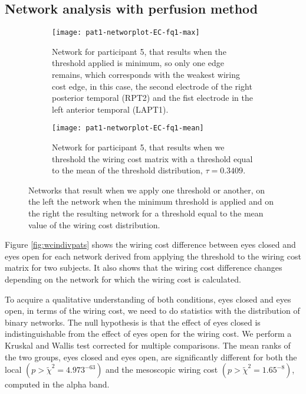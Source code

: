\documentclass[11pt, onecolumn]{article}
\begin{document}
\subsection{Network analysis with perfusion method}
 

\begin{figure}[ht] 
  \begin{subfigure}[t]{0.5\linewidth}
    \centering
    \texttt{[image: pat1-networplot-EC-fq1-max]} 
    \caption{Network for participant 5, that results when  the threshold applied is minimum, so only one edge remains, which corresponds with the weakest wiring cost edge, in this case, the second electrode of the right posterior temporal (RPT2) and the fist electrode in the left anterior temporal (LAPT1).} 
    \label{binaryplotnetwork:a} 
    \vspace{4ex}
  \end{subfigure}%
  \hspace{1ex}
  \begin{subfigure}[t]{0.5\linewidth}
    \centering
    \texttt{[image: pat1-networplot-EC-fq1-mean]} 
    \caption{Network for participant 5, that results when we threshold the wiring cost matrix with a threshold equal to the mean of the threshold distribution, $\tau =  0.3409$.}
    \label{binaryplotnetwork:b} 
    \vspace{4ex}
  \end{subfigure} 
  \caption{Networks that result when we apply one threshold or another, on the left the network when the minimum threshold is applied and on the right the resulting network for a threshold equal to the mean value of the wiring cost distribution.}
  \label{fig:binaryplotnetwork} 
\end{figure}

Figure \ref{fig:wcindivpats} shows the wiring cost difference between eyes closed and eyes open for each network derived from applying the threshold to the wiring cost matrix for two subjects.
It also shows that the wiring cost difference changes depending on the network for which the wiring cost is calculated. 

To acquire a qualitative understanding of both conditions, eyes closed and eyes open, in terms of the wiring cost, we need to do statistics with the distribution of binary networks.
The null hypothesis is that the effect of eyes closed is indistinguishable from the effect of eyes open for the wiring cost.
We perform a Kruskal and Wallis test corrected for multiple comparisons. The mean ranks of the two groups, eyes closed and eyes open, are significantly different for both the local $(p > \tilde{\chi}^2 = 4.973^{-63})$ and the mesoscopic wiring cost $(p > \tilde{\chi}^2 = 1.65^{-8})$, computed in the alpha band.
\end{document}
